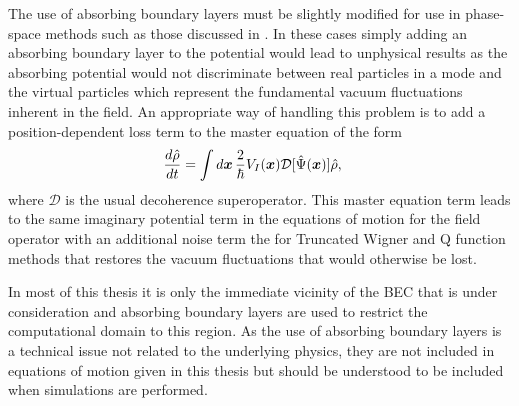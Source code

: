 The use of absorbing boundary layers must be slightly modified for use in phase-space methods such as those discussed in . In these cases simply adding an absorbing boundary layer to the potential would lead to unphysical results as the absorbing potential would not discriminate between real particles in a mode and the virtual particles which represent the fundamental vacuum fluctuations inherent in the field. An appropriate way of handling this problem is to add a position-dependent loss term to the master equation of the form
\begin{align}
    \label{BackgroundTheory:PhaseSpaceAbsorbingBoundaryLayer}
    \frac{d \hat{\rho}}{dt} &= \int d \vect{x}\, \frac{2}{\hbar}V_I(\vect{x})\mathcal{D}[\hat{\Psi}(\vect{x})]\hat{\rho},
\end{align}
where $\mathcal{D}$ is the usual decoherence superoperator. This master equation term leads to the same imaginary potential term in the equations of motion for the field operator with an additional noise term the for Truncated Wigner and Q function methods that restores the vacuum fluctuations that would otherwise be lost.

\parasep

In most of this thesis it is only the immediate vicinity of the BEC that is under consideration and absorbing boundary layers are used to restrict the computational domain to this region.  As the use of absorbing boundary layers is a technical issue not related to the underlying physics, they are not included in equations of motion given in this thesis but should be understood to be included when simulations are performed.  


